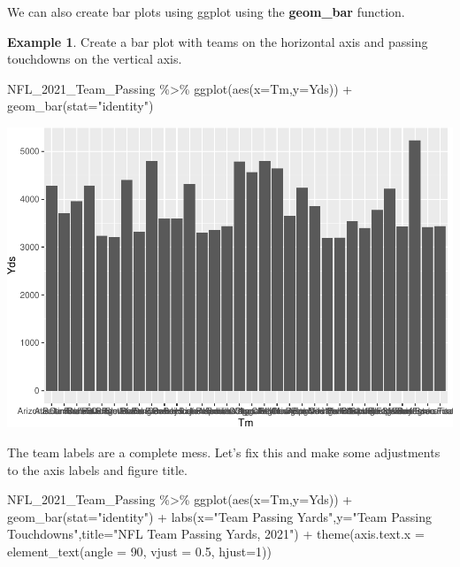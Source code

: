 \documentclass[
]{book}
\newenvironment{Shaded}{\begin{snugshade}}{\end{snugshade}}
\newcommand{\AttributeTok}[1]{\textcolor[rgb]{0.77,0.63,0.00}{#1}}
\newcommand{\DecValTok}[1]{\textcolor[rgb]{0.00,0.00,0.81}{#1}}
\newcommand{\FloatTok}[1]{\textcolor[rgb]{0.00,0.00,0.81}{#1}}
\newcommand{\FunctionTok}[1]{\textcolor[rgb]{0.00,0.00,0.00}{#1}}
\newcommand{\NormalTok}[1]{#1}
\newcommand{\SpecialCharTok}[1]{\textcolor[rgb]{0.00,0.00,0.00}{#1}}
\newcommand{\StringTok}[1]{\textcolor[rgb]{0.31,0.60,0.02}{#1}}
\theoremstyle{definition}
\theoremstyle{definition}
\newtheorem{example}{Example}[chapter]
\theoremstyle{definition}
\theoremstyle{definition}
\theoremstyle{remark}
\begin{document}
We can also create bar plots using ggplot using the \textbf{geom\_bar} function.

\begin{example}
Create a bar plot with teams on the horizontal axis and passing touchdowns on the vertical axis.

\begin{Shaded}
\begin{Highlighting}[]
\NormalTok{NFL\_2021\_Team\_Passing }\SpecialCharTok{\%\textgreater{}\%} \FunctionTok{ggplot}\NormalTok{(}\FunctionTok{aes}\NormalTok{(}\AttributeTok{x=}\NormalTok{Tm,}\AttributeTok{y=}\NormalTok{Yds)) }\SpecialCharTok{+}
  \FunctionTok{geom\_bar}\NormalTok{(}\AttributeTok{stat=}\StringTok{"identity"}\NormalTok{)}
\end{Highlighting}
\end{Shaded}

\includegraphics{series_files/figure-latex/bar-1.pdf}

The team labels are a complete mess. Let's fix this and make some adjustments to the axis labels and figure title.

\begin{Shaded}
\begin{Highlighting}[]
\NormalTok{NFL\_2021\_Team\_Passing }\SpecialCharTok{\%\textgreater{}\%} \FunctionTok{ggplot}\NormalTok{(}\FunctionTok{aes}\NormalTok{(}\AttributeTok{x=}\NormalTok{Tm,}\AttributeTok{y=}\NormalTok{Yds)) }\SpecialCharTok{+}
  \FunctionTok{geom\_bar}\NormalTok{(}\AttributeTok{stat=}\StringTok{"identity"}\NormalTok{) }\SpecialCharTok{+}
  \FunctionTok{labs}\NormalTok{(}\AttributeTok{x=}\StringTok{"Team Passing Yards"}\NormalTok{,}\AttributeTok{y=}\StringTok{"Team Passing Touchdowns"}\NormalTok{,}\AttributeTok{title=}\StringTok{"NFL Team Passing Yards, 2021"}\NormalTok{) }\SpecialCharTok{+}
  \FunctionTok{theme}\NormalTok{(}\AttributeTok{axis.text.x =} \FunctionTok{element\_text}\NormalTok{(}\AttributeTok{angle =} \DecValTok{90}\NormalTok{, }\AttributeTok{vjust =} \FloatTok{0.5}\NormalTok{, }\AttributeTok{hjust=}\DecValTok{1}\NormalTok{))}
\end{Highlighting}
\end{Shaded}


\end{example}
\end{document}
